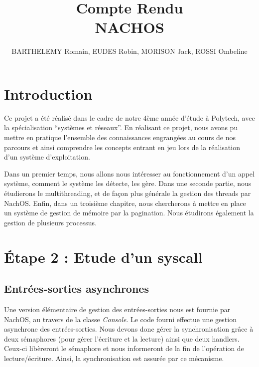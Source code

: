 \documentclass[a4paper,10pt]{article}
\title{Compte Rendu \\ NACHOS}
\author{BARTHELEMY Romain, EUDES Robin, MORISON Jack, ROSSI Ombeline}
\begin{document}
\maketitle
\tableofcontents
\newpage
\section{Introduction}
Ce projet a été réalisé dans le cadre de notre 4ème année d'étude à Polytech, avec la spécialisation ``systèmes et réseaux''.
En réalisant ce projet, nous avons pu mettre en pratique l'ensemble des connaissances engrangées au cours de nos parcours et ainsi
comprendre les concepts entrant en jeu lors de la réalisation d'un système d'exploitation.
\vspace{0.5cm}

Dans un premier temps, nous allons nous intéresser au fonctionnement d'un appel système, comment le système les détecte, les gère.
Dans une seconde partie, nous étudierons le multithreading, et de façon plus générale la gestion des threads par NachOS.
Enfin, dans un troisième chapitre, nous chercherons à mettre en place un système de gestion de mémoire par la pagination.
Nous étudirons également la gestion de plusieurs processus.


\newpage
\section{Étape 2 : Etude d'un syscall}
\subsection{Entrées-sorties asynchrones}
Une version élémentaire de gestion des entrées-sorties nous est fournie par NachOS, au travers de la classe \textit{Console}. Le code fourni
effectue une  gestion asynchrone des entrées-sorties. Nous devons donc gérer la synchronisation grâce à deux sémaphores (pour gérer l'écriture et la lecture)
ainsi que deux handlers. Ceux-ci libèreront le sémaphore et nous informeront de la fin de l'opération de lecture/écriture. Ainsi, la synchronisation est assurée
par ce mécanisme.
\end{document}
